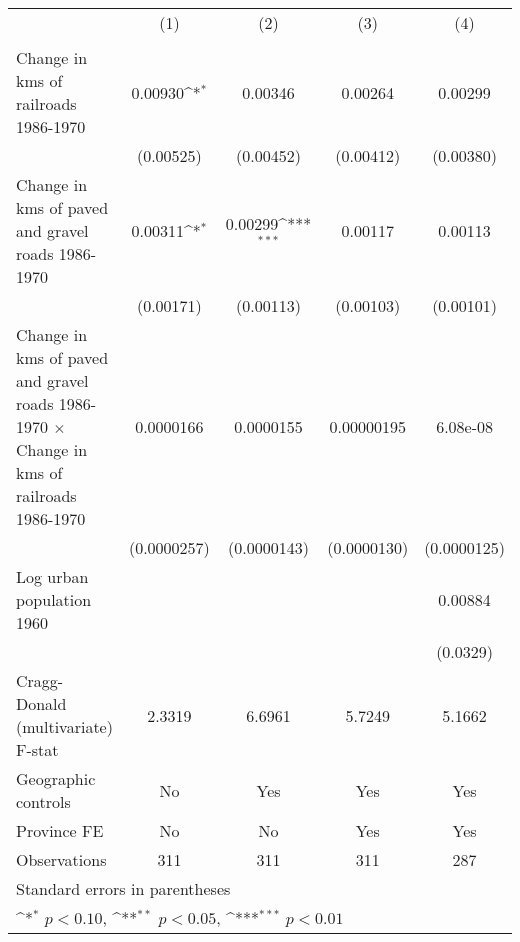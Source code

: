 {
\def\sym#1{\ifmmode^{#1}\else\(^{#1}\)\fi}
\begin{tabular}{l*{4}{c}}
\hline\hline
                &\multicolumn{1}{c}{(1)}&\multicolumn{1}{c}{(2)}&\multicolumn{1}{c}{(3)}&\multicolumn{1}{c}{(4)}\\
                &\multicolumn{1}{c}{}&\multicolumn{1}{c}{}&\multicolumn{1}{c}{}&\multicolumn{1}{c}{}\\
\hline
Change in kms of railroads 1986-1970&  0.00930\sym{*}  &  0.00346         &  0.00264         &  0.00299         \\
                &(0.00525)         &(0.00452)         &(0.00412)         &(0.00380)         \\
[1em]
Change in kms of paved and gravel roads 1986-1970&  0.00311\sym{*}  &  0.00299\sym{***}&  0.00117         &  0.00113         \\
                &(0.00171)         &(0.00113)         &(0.00103)         &(0.00101)         \\
[1em]
Change in kms of paved and gravel roads 1986-1970 $\times$ Change in kms of railroads 1986-1970&0.0000166         &0.0000155         &0.00000195         & 6.08e-08         \\
                &(0.0000257)         &(0.0000143)         &(0.0000130)         &(0.0000125)         \\
[1em]
Log urban population 1960&                  &                  &                  &  0.00884         \\
                &                  &                  &                  & (0.0329)         \\
\hline
Cragg-Donald (multivariate) F-stat&   2.3319         &   6.6961         &   5.7249         &   5.1662         \\
Geographic controls&       No         &      Yes         &      Yes         &      Yes         \\
Province FE     &       No         &       No         &      Yes         &      Yes         \\
Observations    &      311         &      311         &      311         &      287         \\
\hline\hline
\multicolumn{5}{l}{\footnotesize Standard errors in parentheses}\\
\multicolumn{5}{l}{\footnotesize \sym{*} \(p<0.10\), \sym{**} \(p<0.05\), \sym{***} \(p<0.01\)}\\
\end{tabular}
}
